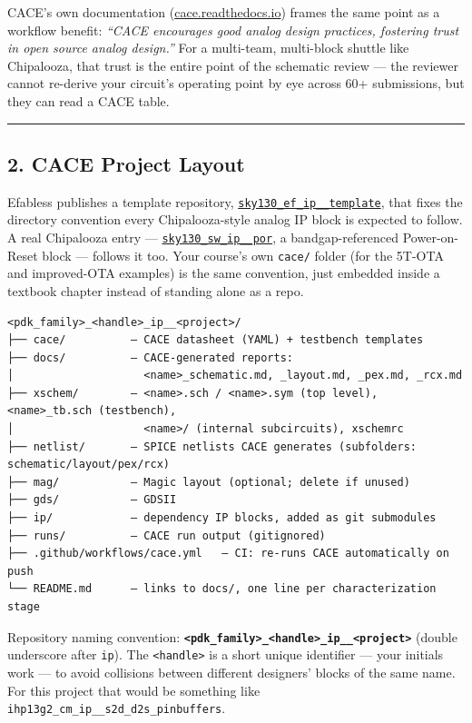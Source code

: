 \documentclass[
]{article}
\begin{document}
CACE's own documentation
(\href{https://cace.readthedocs.io/en/latest/}{cace.readthedocs.io})
frames the same point as a workflow benefit: \emph{``CACE encourages
good analog design practices, fostering trust in open source analog
design.''} For a multi-team, multi-block shuttle like Chipalooza, that
trust is the entire point of the schematic review --- the reviewer
cannot re-derive your circuit's operating point by eye across 60+
submissions, but they can read a CACE table.

\begin{center}\rule{0.5\linewidth}{0.5pt}\end{center}

\hypertarget{cace-project-layout}{%
\subsection{2. CACE Project Layout}\label{cace-project-layout}}

Efabless publishes a template repository,
\href{https://github.com/efabless/sky130_ef_ip__template}{\texttt{sky130\_ef\_ip\_\_template}},
that fixes the directory convention every Chipalooza-style analog IP
block is expected to follow. A real Chipalooza entry ---
\href{https://github.com/efabless/sky130_sw_ip__por}{\texttt{sky130\_sw\_ip\_\_por}},
a bandgap-referenced Power-on-Reset block --- follows it too. Your
course's own \texttt{cace/} folder (for the 5T-OTA and improved-OTA
examples) is the same convention, just embedded inside a textbook
chapter instead of standing alone as a repo.

\begin{verbatim}
<pdk_family>_<handle>_ip__<project>/
├── cace/          — CACE datasheet (YAML) + testbench templates
├── docs/          — CACE-generated reports:
│                    <name>_schematic.md, _layout.md, _pex.md, _rcx.md
├── xschem/        — <name>.sch / <name>.sym (top level), <name>_tb.sch (testbench),
│                    <name>/ (internal subcircuits), xschemrc
├── netlist/       — SPICE netlists CACE generates (subfolders: schematic/layout/pex/rcx)
├── mag/           — Magic layout (optional; delete if unused)
├── gds/           — GDSII
├── ip/            — dependency IP blocks, added as git submodules
├── runs/          — CACE run output (gitignored)
├── .github/workflows/cace.yml   — CI: re-runs CACE automatically on push
└── README.md      — links to docs/, one line per characterization stage
\end{verbatim}

Repository naming convention:
\textbf{\texttt{\textless{}pdk\_family\textgreater{}\_\textless{}handle\textgreater{}\_ip\_\_\textless{}project\textgreater{}}}
(double underscore after \texttt{ip}). The
\texttt{\textless{}handle\textgreater{}} is a short unique identifier
--- your initials work --- to avoid collisions between different
designers' blocks of the same name. For this project that would be
something like \texttt{ihp13g2\_cm\_ip\_\_s2d\_d2s\_pinbuffers}.
\end{document}
